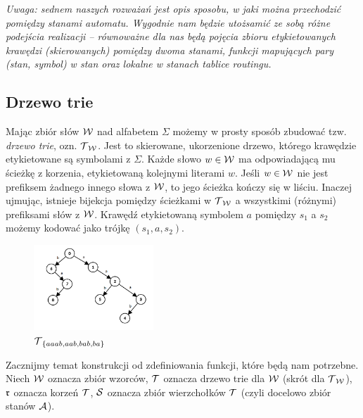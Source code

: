 \textit{Uwaga: sednem naszych rozważań jest opis sposobu, w jaki można przechodzić pomiędzy stanami automatu. Wygodnie nam będzie utożsamić ze sobą różne podejścia realizacji -- równoważne dla nas będą pojęcia zbioru etykietowanych krawędzi (skierowanych) pomiędzy dwoma stanami, funkcji mapujących pary (stan, symbol) w stan oraz lokalne w stanach tablice routingu.}

\subsection{Drzewo trie}
Mając zbiór słów $\operatorname{\mathcal{W}}$ nad alfabetem $\Sigma$ możemy w prosty sposób zbudować tzw. \textit{drzewo trie}, ozn. $\operatorname{\mathcal{T}}_{\operatorname{\mathcal{W}}}$. Jest to skierowane, ukorzenione drzewo, którego krawędzie etykietowane są symbolami z $\Sigma$. Każde słowo $w\in\operatorname{\mathcal{W}}$ ma odpowiadającą mu ścieżkę z korzenia, etykietowaną kolejnymi literami $w$. Jeśli $w\in\operatorname{\mathcal{W}}$ nie jest prefiksem żadnego innego słowa z $\operatorname{\mathcal{W}}$, to jego ścieżka kończy się w liściu. Inaczej ujmując, istnieje bijekcja pomiędzy ścieżkami w $\operatorname{\mathcal{T}}_{\operatorname{\mathcal{W}}}$ a wszystkimi (różnymi) prefiksami słów z $\operatorname{\mathcal{W}}$. Krawędź etykietowaną symbolem $a$ pomiędzy $s_1$ a $s_2$ możemy kodować jako trójkę $(s_1, a, s_2)$.

\begin{figure}[h!]
    \centering
    \includegraphics[width=0.4\textwidth]{graphics/trie-example.png}
    \caption{$\operatorname{\mathcal{T}}_{\{aaab, aab, bab, ba\}}$}
    \label{fig:trie}
\end{figure}

Zacznijmy temat konstrukcji od zdefiniowania funkcji, które będą nam potrzebne. Niech $\operatorname{\mathcal{W}}$ oznacza zbiór wzorców, $\operatorname{\mathcal{T}}$ oznacza drzewo trie dla $\operatorname{\mathcal{W}}$ (skrót dla $\operatorname{\mathcal{T}}_{\operatorname{\mathcal{W}}}$), $\operatorname{\mathfrak{r}}$ oznacza korzeń $\operatorname{\mathcal{T}}$, $\operatorname{\mathcal{S}}$ oznacza zbiór wierzchołków $\operatorname{\mathcal{T}}$ (czyli docelowo zbiór stanów $\operatorname{\mathcal{A}}$).

